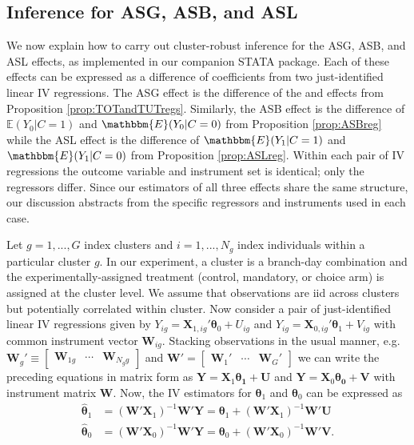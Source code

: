 \begin{appendix}
\normalsize
\normalsize


\subsection{Inference for ASG, ASB, and ASL}
\label{subsec:inference}

We now explain how to carry out cluster-robust inference for the ASG, ASB, and ASL effects, as implemented in our companion STATA package.
Each of these effects can be expressed as a difference of coefficients from two just-identified linear IV regressions.
The ASG effect is the difference of the  and  effects from Proposition \ref{prop:TOTandTUTregs}. 
Similarly, the ASB effect is the difference of $\mathbb{E}(Y_0|C=1)$ and $\mathbbm{E}(Y_0|C=0)$ from Proposition \ref{prop:ASBreg} while the ASL effect is the difference of $\mathbbm{E}(Y_1|C=1)$ and $\mathbbm{E}(Y_1|C=0)$ from Proposition \ref{prop:ASLreg}.
Within each pair of IV regressions the outcome variable and instrument set is identical; only the regressors differ. 
Since our estimators of all three effects share the same structure, our discussion abstracts from the specific regressors and instruments used in each case.

Let $g = 1, ..., G$ index clusters and $i = 1, ..., N_g$ index individuals within a particular cluster $g$. 
In our experiment, a cluster is a branch-day combination and the experimentally-assigned treatment (control, mandatory, or choice arm) is assigned at the cluster level.
We assume that observations are iid across clusters but potentially correlated within cluster.
Now consider a pair of just-identified linear IV regressions given by
$Y_{ig} = \boldsymbol{X}_{1,ig}' \boldsymbol{\theta}_0 + U_{ig}$ and $Y_{ig} = \boldsymbol{X}_{0,ig}' \boldsymbol{\theta}_1 + V_{ig}$ with common instrument vector $\boldsymbol{W}_{ig}$. 
Stacking observations in the usual manner, e.g.\
$\mathbf{W}_g' \equiv \begin{bmatrix}
\boldsymbol{W}_{1g} & \cdots & 
\boldsymbol{W}_{N_gg} 
\end{bmatrix}$ and 
$\mathbf{W}' = \begin{bmatrix}
\mathbf{W}_1' & \cdots & \mathbf{W}_G'
\end{bmatrix}$
we can write the preceding equations in matrix form as $\mathbf{Y} = \mathbf{X}_1\boldsymbol{\theta_1} + \mathbf{U}$ and $\mathbf{Y} = \mathbf{X}_0\boldsymbol{\theta_0} + \mathbf{V}$ with instrument matrix $\mathbf{W}$.
Now, the IV estimators for $\boldsymbol{\theta}_1$ and $\boldsymbol{\theta}_0$ can be expressed as 
\begin{align*}
\widehat{\boldsymbol{\theta}}_1 
&= \left(\mathbf{W}'\mathbf{X}_1\right)^{-1}\mathbf{W}'\mathbf{Y}  = \boldsymbol{\theta}_1 + \left(\mathbf{W}'\mathbf{X}_1\right)^{-1}\mathbf{W}'\mathbf{U}\\ 
\widehat{\boldsymbol{\theta}}_0 
&= \left(\mathbf{W}'\mathbf{X}_0\right)^{-1}\mathbf{W}'\mathbf{Y} = \boldsymbol{\theta}_0 + \left(\mathbf{W}'\mathbf{X}_0\right)^{-1}\mathbf{W}'\mathbf{V}.
\end{align*}


\end{appendix}
